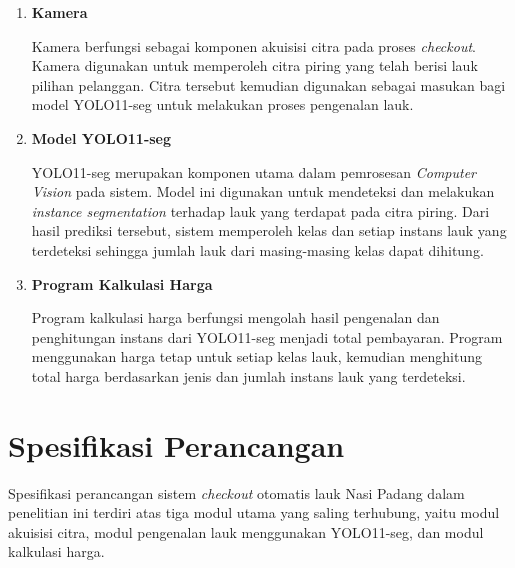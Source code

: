 \begin{enumerate}
    \item \textbf{Kamera}

    Kamera berfungsi sebagai komponen akuisisi citra pada proses \textit{checkout}. Kamera digunakan untuk memperoleh citra piring yang telah berisi lauk pilihan pelanggan. Citra tersebut kemudian digunakan sebagai masukan bagi model YOLO11-seg untuk melakukan proses pengenalan lauk.

    \item \textbf{Model YOLO11-seg}

    YOLO11-seg merupakan komponen utama dalam pemrosesan \textit{Computer Vision} pada sistem. Model ini digunakan untuk mendeteksi dan melakukan \textit{instance segmentation} terhadap lauk yang terdapat pada citra piring. Dari hasil prediksi tersebut, sistem memperoleh kelas dan setiap instans lauk yang terdeteksi sehingga jumlah lauk dari masing-masing kelas dapat dihitung.

    \item \textbf{Program Kalkulasi Harga}

    Program kalkulasi harga berfungsi mengolah hasil pengenalan dan penghitungan instans dari YOLO11-seg menjadi total pembayaran. Program menggunakan harga tetap untuk setiap kelas lauk, kemudian menghitung total harga berdasarkan jenis dan jumlah instans lauk yang terdeteksi.
\end{enumerate}


\section{Spesifikasi Perancangan}

Spesifikasi perancangan sistem \textit{checkout} otomatis lauk Nasi Padang dalam penelitian ini terdiri atas tiga modul utama yang saling terhubung, yaitu modul akuisisi citra, modul pengenalan lauk menggunakan YOLO11-seg, dan modul kalkulasi harga.

